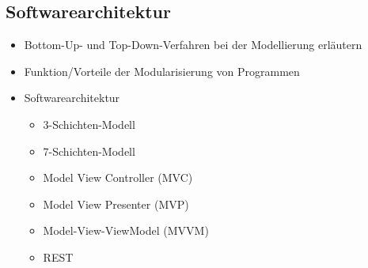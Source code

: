 \subsection{Softwarearchitektur}
\label{sec:Softwarearchitektur}

\begin{itemize}
	\item Bottom-Up- und Top-Down-Verfahren bei der Modellierung erläutern
	\item Funktion/Vorteile der Modularisierung von Programmen
	\item Softwarearchitektur
	\begin{itemize}
		\item 3-Schichten-Modell
		\item 7-Schichten-Modell
		\item Model View Controller (MVC)
		\item Model View Presenter (MVP)
		\item Model-View-ViewModel (MVVM)
		\item REST
	\end{itemize}
\end{itemize}